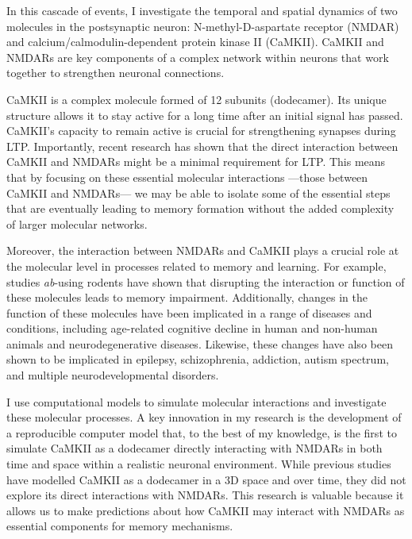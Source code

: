 \documentclass[
  11pt,
  letterpaper,
]{scrreprt}
\begin{document}
In this cascade of events, I investigate the temporal and spatial
dynamics of two molecules in the postsynaptic neuron:
N-methyl-D-aspartate receptor (NMDAR) and calcium/calmodulin-dependent
protein kinase II (CaMKII). CaMKII and NMDARs are key components of a
complex network within neurons that work together to strengthen neuronal
connections.

CaMKII is a complex molecule formed of 12 subunits (dodecamer). Its
unique structure allows it to stay active for a long time after an
initial signal has passed. CaMKII's capacity to remain active is crucial
for strengthening synapses during LTP. Importantly, recent research has
shown that the direct interaction between CaMKII and NMDARs might be a
minimal requirement for LTP. This means that by focusing on these
essential molecular interactions ---those between CaMKII and NMDARs---
we may be able to isolate some of the essential steps that are
eventually leading to memory formation without the added complexity of
larger molecular networks.

Moreover, the interaction between NMDARs and CaMKII plays a crucial role
at the molecular level in processes related to memory and learning. For
example, studies \emph{ab}-using rodents have shown that disrupting the
interaction or function of these molecules leads to memory impairment.
Additionally, changes in the function of these molecules have been
implicated in a range of diseases and conditions, including age-related
cognitive decline in human and non-human animals and neurodegenerative
diseases. Likewise, these changes have also been shown to be implicated
in epilepsy, schizophrenia, addiction, autism spectrum, and multiple
neurodevelopmental disorders.

I use computational models to simulate molecular interactions and
investigate these molecular processes. A key innovation in my research
is the development of a reproducible computer model that, to the best of
my knowledge, is the first to simulate CaMKII as a dodecamer directly
interacting with NMDARs in both time and space within a realistic
neuronal environment. While previous studies have modelled CaMKII as a
dodecamer in a 3D space and over time, they did not explore its direct
interactions with NMDARs. This research is valuable because it allows us
to make predictions about how CaMKII may interact with NMDARs as
essential components for memory mechanisms.
\end{document}
